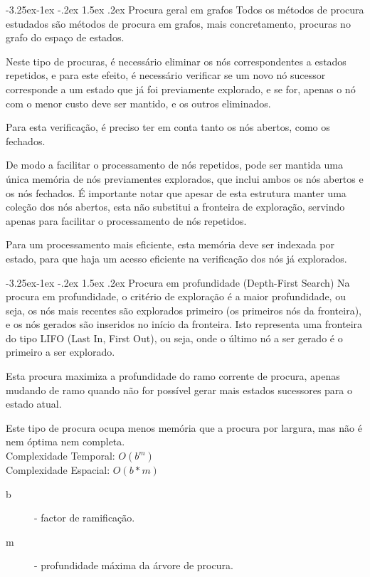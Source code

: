 \documentclass[a4paper,12pt]{article}
\makeatletter
\renewcommand\subparagraph{\@startsection{subparagraph}{5}{\z@}%
                {-3.25ex\@plus -1ex \@minus -.2ex}%
                {1.5ex \@plus .2ex}%
                {\normalfont\normalsize\bfseries}}
\makeatother
\begin{document}
\subparagraph{Procura geral em grafos}
Todos os métodos de procura estudados são métodos de procura em grafos, mais concretamento, procuras no grafo do espaço de estados.

Neste tipo de procuras, é necessário eliminar os nós correspondentes a estados repetidos, e para este efeito, é necessário verificar se um novo nó sucessor corresponde a um estado que já foi previamente explorado, e se for, apenas o nó com o menor custo deve ser mantido, e os outros eliminados.

Para esta verificação, é preciso ter em conta tanto os nós abertos, como os fechados.

De modo a facilitar o processamento de nós repetidos, pode ser mantida uma única memória de nós previamentes explorados, que inclui ambos os nós abertos e os nós fechados. É importante notar que apesar de esta estrutura manter uma coleção dos nós abertos, esta não substitui a fronteira de exploração, servindo apenas para facilitar o processamento de nós repetidos.

Para um processamento mais eficiente, esta memória deve ser indexada por estado, para que haja um acesso eficiente na verificação dos nós já explorados.

\subparagraph{Procura em profundidade (Depth-First Search)}
Na procura em profundidade, o critério de exploração é a maior profundidade, ou seja, os nós mais recentes são explorados primeiro (os primeiros nós da fronteira), e os nós gerados são inseridos no início da fronteira. Isto representa uma fronteira do tipo LIFO (Last In, First Out), ou seja, onde o último nó a ser gerado é o primeiro a ser explorado.

Esta procura maximiza a profundidade do ramo corrente de procura, apenas mudando de ramo quando não for possível gerar mais estados sucessores para o estado atual.

Este tipo de procura ocupa menos memória que a procura por largura, mas não é nem óptima nem completa.
\\

Complexidade Temporal: \(O(b^m)\)
\\

Complexidade Espacial: \( O(b*m)\)
\begin{description}
	\item[b] - factor de ramificação.
	\item[m] - profundidade máxima da árvore de procura.
\end{description}
\end{document}
